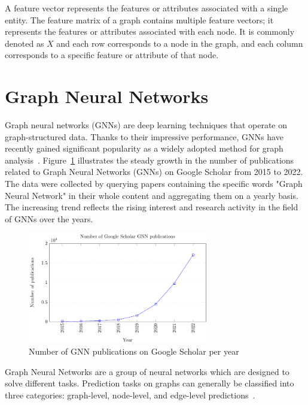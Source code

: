 A feature vector represents the features or attributes associated with a single entity.
The feature matrix of a graph contains multiple feature vectors; it represents the features or attributes associated with each node.
It is commonly denoted as $X$ and  each row corresponds to a node in the graph, and each column corresponds to a specific feature or attribute of that node.

\section{Graph Neural Networks}
\label{sec:graph_neural_networks}%


Graph neural networks (GNNs) are deep learning techniques that operate on graph-structured data.
Thanks to their impressive performance, GNNs have recently gained significant popularity as a widely adopted method for graph analysis~\cite{KERAMATFAR2022100401}.
Figure~\ref{fig:google_scholar} illustrates the steady growth in the number of publications related to Graph Neural Networks (GNNs) on Google Scholar from 2015 to 2022.
The data were collected by querying papers containing the specific words "Graph Neural Network" in their whole content and aggregating them on a yearly basis.
The increasing trend reflects the rising interest and research activity in the field of GNNs over the years.

\begin{figure}[t]
    \centering
    \includegraphics[width=0.7\textwidth]{Images/google_scholar}
    \caption{Number of GNN publications on Google Scholar per year}
    \label{fig:google_scholar}
\end{figure}

Graph Neural Networks are a group of neural networks which are designed to solve different tasks.
Prediction tasks on graphs can generally be classified into three categories: graph-level, node-level, and edge-level predictions~\cite{sanchez-lengeling2021a}.

